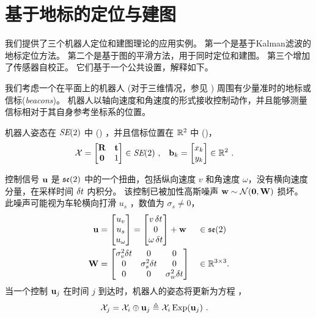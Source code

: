 
\newcommand{\dx}{{\delta\bfx}}

\section{基于地标的定位与建图}
\label{sec:SLAM}

我们提供了三个机器人定位和建图理论的应用实例。 
第一个是基于Kalman滤波的地标定位方法。
第二个是基于图的平滑方法，用于同时定位和建图。
第三个增加了传感器自校正。
它们基于一个公共设置，解释如下。

我们考虑一个在平面上的机器人
(对于三维情况，参见 )
周围有少量准时的地标或信标(\emph{beacons})。 
机器人以轴向速度和角速度的形式接收控制动作，并且能够测量信标相对于其自身参考坐标系的位置。


机器人姿态在 $\textit{SE}(2)$ 中 () ，并且信标位置在 ${\mathbb R}^2$ 中 ()，
%
\begin{align*}
\mathcal{X} &= 
\begin{bmatrix}
{\bf R} & {\bf t} \\ \bf0 & 1
\end{bmatrix}\in\textit{SE}(2)
~,
&
{\bf b}_k &= \begin{bmatrix}
x_k \\ y_k
\end{bmatrix}\in{\mathbb R}^2
~.
\end{align*}

控制信号 ${\bf u}$ 是 ${\mathfrak {se}}(2)$ 中的一个扭曲，包括纵向速度 $v$ 和角速度 $\omega$，没有横向速度分量，在采样时间 $\delta t$ 内积分。
该控制已被加性高斯噪声 ${\bf w}\sim\mathcal{N}(\bf0,{\bf W})$ 损坏。
此噪声可能视为车轮横向打滑 $u_s$ ，数值为 $\sigma_s\ne0$，
%
\begin{align}
{\bf u} &
= \begin{bmatrix} u_v \\ u_s \\ u_\omega \end{bmatrix} 
= \begin{bmatrix} v\,\delta t \\ 0 \\ \omega\,\delta t \end{bmatrix}+{\bf w}  
&&\in{\mathfrak {se}}(2)
\\
{\bf W} &= \begin{bmatrix}
\sigma_v^2\delta t &0&0 \\ 0&\sigma_s^2\delta t&0 \\ 0&0&\sigma_w^2\delta t
\end{bmatrix} &&\in{\mathbb R}^{3\times3}.
\end{align}
%
当一个控制 ${\bf u}_j$ 在时间 $j$ 到达时，机器人的姿态将更新为方程 ，
%
\begin{align}\label{equ:motion}
\mathcal{X}_j &= \mathcal{X}_i \oplus {\bf u}_j \triangleq \mathcal{X}_i \operatorname*{Exp}({\bf u}_j)
~.
\end{align}


